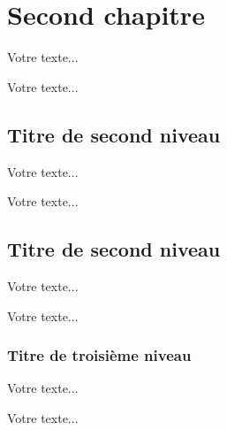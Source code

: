 
\newpage

\section{Second chapitre}

Votre texte...

Votre texte...

\subsection{Titre de second niveau}

Votre texte...

Votre texte...

\subsection{Titre de second niveau}
 
Votre texte...
 
Votre texte...

\subsubsection{Titre de troisième niveau}
 
Votre texte...
 
Votre texte...

